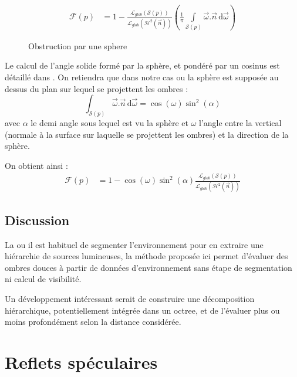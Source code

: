 \documentclass[10pt,a4paper,twoside, twocolumn]{report}
\newcommand*{\rootPath}{../}
\begin{document}
\begin{align}
	\mathcal F(p)	&=	1 - \frac{\mathcal L_{glob}(\mathcal{S}(p))}{\mathcal L_{glob}(\mathcal{H}^2(\vec{n}))}\left(\frac{1}{\pi}\int\limits_{\mathcal{S}(p)}\vec\omega.\vec n\, \mathrm d\vec\omega\right)
\end{align}

\begin{figure}[!ht]
	\centering
	
	\caption{Obstruction par une sphere}
	\label{fig:tikz:obstruction}
\end{figure}

Le calcul de l'angle solide formé par la sphère, et pondéré par un cosinus est détaillé dans \cite{Snyder1996}. On retiendra que dans notre cas ou la sphère est supposée au dessus du plan sur lequel se projettent les ombres :
\begin{equation}
	\int_{\mathcal{S}(p)}\vec\omega.\vec n\, \mathrm d\vec\omega = \cos(\omega)\sin^2(\alpha)
\end{equation}
avec $\alpha$ le demi angle sous lequel est vu la sphère et $\omega$ l'angle entre la vertical (normale à la surface sur laquelle se projettent les ombres) et la direction de la sphère.

On obtient ainsi :
\begin{align}
	\mathcal F(p)	&=	1 - \cos(\omega)\sin^2(\alpha)\frac{\mathcal L_{glob}(\mathcal{S}(p))}{\mathcal L_{glob}(\mathcal{H}^2(\vec{n}))}
\end{align}


\subsection{Discussion}

La ou il est habituel de segmenter l'environnement pour en extraire une hiérarchie de sources lumineuses, la méthode proposée ici permet d'évaluer des ombres douces à partir de données d'environnement sans étape de segmentation ni calcul de visibilité. 

Un développement intéressant serait de construire une décomposition hiérarchique, potentiellement intégrée dans un octree, et de l'évaluer plus ou moins profondément selon la distance considérée.



\section{Reflets spéculaires}
\end{document}
